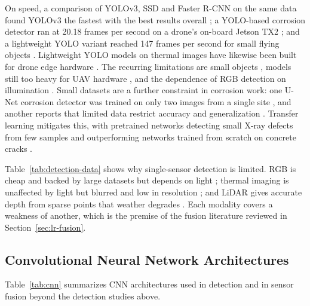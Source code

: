 On speed, a comparison of YOLOv3, SSD and
Faster R-CNN on the same data found YOLOv3 the fastest with the best results
overall \citep{Srivastava2021}; a YOLO-based corrosion detector ran at 20.18 frames per second on
a drone's on-board Jetson TX2 \citep{Yu2023}; and a lightweight YOLO variant reached 147
frames per second for small flying objects \citep{Tao2021}. Lightweight YOLO models on
thermal images have likewise been built for drone edge hardware \citep{Liu2026c,Wang2024b,Wen2025}.
The recurring limitations are small objects \citep{Zhang2024,Srivastava2021,Chen2025}, models still too
heavy for UAV hardware \citep{Jiang2025,Sun2023}, and the dependence of RGB detection on
illumination \citep{Zhang2024,Lalitha2022,Wu2023,Wu2026}. Small datasets are a further constraint in
corrosion work: one U-Net corrosion detector was trained on only two images from
a single site \citep{Suzuki2026}, and another reports that limited data restrict accuracy and
generalization \citep{Hu2023}. Transfer learning mitigates this, with pretrained networks
detecting small X-ray defects from few samples \citep{Gong2022} and outperforming networks
trained from scratch on concrete cracks \citep{Su2024}.

Table~\ref{tab:detection-data} shows why single-sensor detection is limited. RGB is cheap and backed by large datasets
\citep{Zhang2024,Srivastava2021,Suzuki2026} but depends on light \citep{Zhang2024,Lalitha2022,Wu2023,Wu2026}; thermal imaging is unaffected by light \citep{Liu2026c,Wen2025} but blurred and low in
resolution \citep{Liu2026c,Wang2024b,Wen2025}; and LiDAR gives accurate depth \citep{Naich2024,Prasanth2026,Soumya2026} from sparse points that weather degrades
\citep{Prasanth2026,Naich2024,Soumya2026}. Each modality covers a weakness of another, which is the premise of the fusion
literature reviewed in Section~\ref{sec:lr-fusion}.

\subsection{Convolutional Neural Network Architectures}

Table~\ref{tab:cnn} summarizes CNN architectures used in detection and in
sensor fusion beyond the detection studies above.

